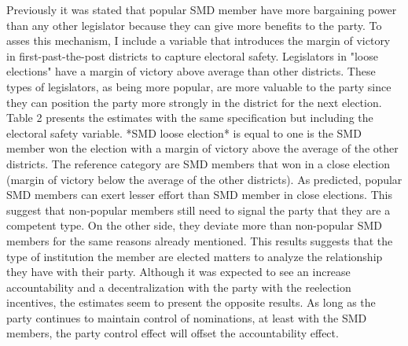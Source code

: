 \documentclass{article}
\begin{document}
Previously it was stated that popular SMD member have more bargaining power than any other legislator because they can give more benefits to the party. To asses this mechanism, I include a variable that introduces the margin of victory in first-past-the-post districts to capture electoral safety. Legislators in "loose elections" have a margin of victory above average than other districts. These types of legislators, as being more popular, are more valuable to the party since they can position the party more strongly in the district for the next election. Table 2 presents the estimates with the same specification but including the electoral safety variable. *SMD loose election* is equal to one is the SMD member won the election with a margin of victory above the average of the other districts. The reference category are SMD members that won in a close election (margin of victory below the average of the other districts). As predicted, popular SMD members can exert lesser effort than SMD member in close elections. This suggest that non-popular members still need to signal the party that they are a competent type. On the other side, they deviate more than non-popular SMD members for the same reasons already mentioned. This results suggests that the type of institution the member are elected matters to analyze the relationship they have with their party. Although it was expected to see an increase accountability and a decentralization with the party with the reelection incentives, the estimates seem to present the opposite results. As long as the party continues to maintain control of nominations, at least with the SMD members, the party control effect will offset the accountability effect. 
\end{document}
